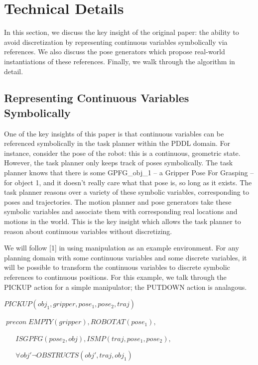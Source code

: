 \documentclass[12pt]{article}
\begin{document}
\section{Technical Details}

In this section, we discuss the key insight of the original paper: the ability to avoid discretization by representing continuous variables symbolically via references.  
We also discuss the pose generators which propose real-world instantiations of these references.  
Finally, we walk through the algorithm in detail.

\subsection{Representing Continuous Variables Symbolically}

One of the key insights of this paper is that continuous variables can be referenced symbolically in the task planner within the PDDL domain.  
For instance, consider the pose of the robot: this is a continuous, geometric state.  However, the task planner only keeps track of poses symbolically.  
The task planner knows that there is some GPFG\_obj\_1 -- a Gripper Pose For Grasping -- for object 1, and it doesn't really care what that pose is, so long as it exists.  
The task planner reasons over a variety of these symbolic variables, corresponding to poses and trajectories.  
The motion planner and pose generators take these symbolic variables and associate them with corresponding real locations and motions in the world.  
This is the key insight which allows the task planner to reason about continuous variables without discretizing.  

We will follow [1] in using manipulation as an example environment.  For any planning domain with some continuous variables and some discrete variables, it will be possible to transform the continuous variables to discrete symbolic references to continuous positions.  For this example, we talk through the PICKUP action for a simple manipulator; the PUTDOWN action is analagous.


\vspace{10pt}

$PICKUP(obj_1, gripper, pose_1, pose_2, traj)$

$\; precon \; EMPTY(gripper), ROBOTAT(pose_1), $

$\; \; \;\; \; \; ISGPFG(pose_2, obj), ISMP(traj, pose_1, pose_2), $

$\; \; \; \; \; \;\forall obj' \neg OBSTRUCTS(obj', traj, obj_1)$
\end{document}
